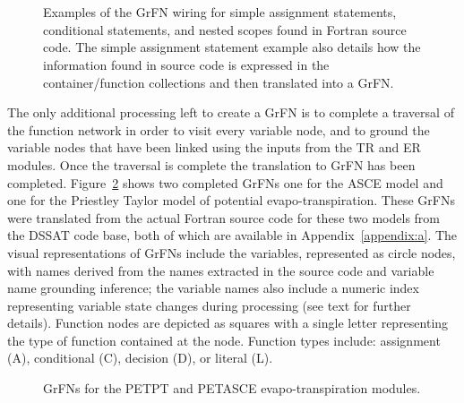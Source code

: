 \FloatBarrier
\begin{figure}[!htbp]
  \centering
  \\
  \\
  \caption[Source Code to GrFN Wiring Examples]{Examples of the GrFN wiring for simple assignment statements, conditional statements, and nested scopes found in Fortran source code. The simple assignment statement example also details how the information found in source code is expressed in the container/function collections and then translated into a GrFN.}
  \label{fig:statement_wiring}
\end{figure}
\FloatBarrier

The only additional processing left to create a GrFN is to complete a traversal of the function network in order to visit every variable node, and to ground the variable nodes that have been linked using the inputs from the TR and ER modules.
Once the traversal is complete the translation to GrFN has been completed.
Figure~\ref{fig:grfn_cgs} shows two completed GrFNs one for the ASCE model and one for the Priestley Taylor model of potential evapo-transpiration.
These GrFNs were translated from the actual Fortran source code for these two models from the DSSAT code base, both of which are available in Appendix~\ref{appendix:a}.
The visual representations of GrFNs include the variables, represented as circle nodes, with names derived from the names extracted in the source code and variable name grounding inference; the variable names also include a numeric index representing variable state changes during processing (see text for further details).
Function nodes are depicted as squares with a single letter representing the type of function contained at the node.
Function types include: assignment (A), conditional (C), decision (D), or literal (L).

\FloatBarrier
\begin{figure}[!htbp]
  \centering
  \hfill
  \caption[Evapo-transpiration GrFN Examples]{GrFNs for the PETPT and PETASCE evapo-transpiration modules.}
  \label{fig:grfn_cgs}
\end{figure}
\FloatBarrier

